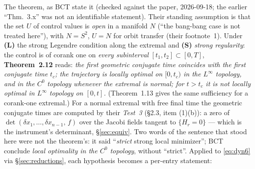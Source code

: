 \documentclass[11pt]{article}
\theoremstyle{definition}
\begin{document}
The theorem, as BCT state it (checked against the paper, 2026-09-18; the
earlier ``Thm.~3.x'' was not an identifiable statement). Their standing
assumption is that the set $U$ of control values is \emph{open} in a manifold
$N$ (``the bang-bang case is not treated here''), with $N=S^2$, $U=N$ for orbit
transfer (their footnote~1). Under
\textbf{(L)} the strong Legendre condition along the extremal and
\textbf{(S)} \emph{strong regularity}: the control is of corank one on
\emph{every subinterval} $[t_1,t_2]\subset[0,T]$,
\textbf{Theorem~2.12} reads: \emph{the first geometric conjugate time coincides
with the first conjugate time $t_c$; the trajectory is locally optimal on
$[0,t_c)$ in the $L^\infty$ topology, and in the $C^0$ topology whenever the
extremal is normal; for $t>t_c$ it is not locally optimal in $L^\infty$ topology
on $[0,t]$.} (Theorem~1.13 gives the same sufficiency for a corank-one extremal.)
For a normal extremal with free final time the geometric conjugate times are
computed by their \emph{Test~3} (\S2.3, item (1)(b)): a zero of
$\det(\delta x_1,\dots,\delta x_{n-1},\,f)$ over the Jacobi fields tangent to
$\{H_r=0\}$ --- which is the instrument's determinant, \S\ref{sec:equiv}.
Two words of the sentence that stood here were not the theorem's: it said
``\emph{strict} strong local minimizer''; BCT conclude \emph{local optimality in
the $C^0$ topology}, without ``strict''. Applied to \eqref{eq:dyn6} via
\S\ref{sec:reductions}, each hypothesis becomes a per-entry statement:
\end{document}

